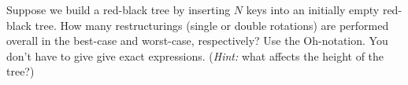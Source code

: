 Suppose we build a red-black tree by inserting $N$ keys into an
initially empty red-black tree.  How many restructurings (single or
double rotations) are performed overall in the best-case and
worst-case, respectively?  Use the Oh-notation. You don't have to give
give exact expressions. ({\em Hint:} what affects the height of the
tree?)
